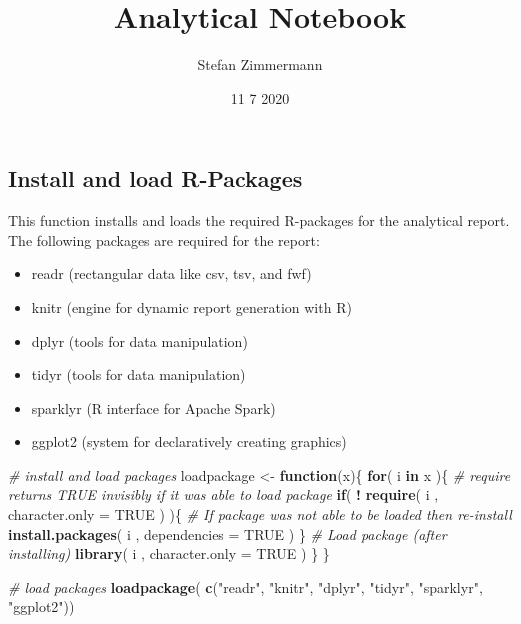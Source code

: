 \documentclass[]{article}
\title{Analytical Notebook}
\author{Stefan Zimmermann}
\date{11 7 2020}
\newenvironment{Shaded}{\begin{snugshade}}{\end{snugshade}}
\newcommand{\CommentTok}[1]{\textcolor[rgb]{0.56,0.35,0.01}{\textit{#1}}}
\newcommand{\ControlFlowTok}[1]{\textcolor[rgb]{0.13,0.29,0.53}{\textbf{#1}}}
\newcommand{\DataTypeTok}[1]{\textcolor[rgb]{0.13,0.29,0.53}{#1}}
\newcommand{\KeywordTok}[1]{\textcolor[rgb]{0.13,0.29,0.53}{\textbf{#1}}}
\newcommand{\NormalTok}[1]{#1}
\newcommand{\OperatorTok}[1]{\textcolor[rgb]{0.81,0.36,0.00}{\textbf{#1}}}
\newcommand{\OtherTok}[1]{\textcolor[rgb]{0.56,0.35,0.01}{#1}}
\newcommand{\StringTok}[1]{\textcolor[rgb]{0.31,0.60,0.02}{#1}}
\providecommand{\tightlist}{%
  \setlength{\itemsep}{0pt}\setlength{\parskip}{0pt}}
\begin{document}
\maketitle

\hypertarget{install-and-load-r-packages}{%
\subsection{Install and load
R-Packages}\label{install-and-load-r-packages}}

This function installs and loads the required R-packages for the
analytical report. The following packages are required for the report:

\begin{itemize}
\tightlist
\item
  readr (rectangular data like csv, tsv, and fwf)
\item
  knitr (engine for dynamic report generation with R)
\item
  dplyr (tools for data manipulation)
\item
  tidyr (tools for data manipulation)
\item
  sparklyr (R interface for Apache Spark)
\item
  ggplot2 (system for declaratively creating graphics)
\end{itemize}

\begin{Shaded}
\begin{Highlighting}[]
\CommentTok{# install and load packages}
\NormalTok{loadpackage <-}\StringTok{ }\ControlFlowTok{function}\NormalTok{(x)\{}
  \ControlFlowTok{for}\NormalTok{( i }\ControlFlowTok{in}\NormalTok{ x )\{}
    \CommentTok{#  require returns TRUE invisibly if it was able to load package}
    \ControlFlowTok{if}\NormalTok{( }\OperatorTok{!}\StringTok{ }\KeywordTok{require}\NormalTok{( i , }\DataTypeTok{character.only =} \OtherTok{TRUE}\NormalTok{ ) )\{}
      \CommentTok{#  If package was not able to be loaded then re-install}
      \KeywordTok{install.packages}\NormalTok{( i , }\DataTypeTok{dependencies =} \OtherTok{TRUE}\NormalTok{ )}
\NormalTok{    \}}
    \CommentTok{#  Load package (after installing)}
    \KeywordTok{library}\NormalTok{( i , }\DataTypeTok{character.only =} \OtherTok{TRUE}\NormalTok{ )}
\NormalTok{  \}}
\NormalTok{\}}

\CommentTok{# load packages}
\KeywordTok{loadpackage}\NormalTok{( }\KeywordTok{c}\NormalTok{(}\StringTok{"readr"}\NormalTok{, }\StringTok{"knitr"}\NormalTok{, }\StringTok{"dplyr"}\NormalTok{, }\StringTok{"tidyr"}\NormalTok{, }\StringTok{"sparklyr"}\NormalTok{, }\StringTok{"ggplot2"}\NormalTok{))}
\end{Highlighting}
\end{Shaded}
\end{document}
